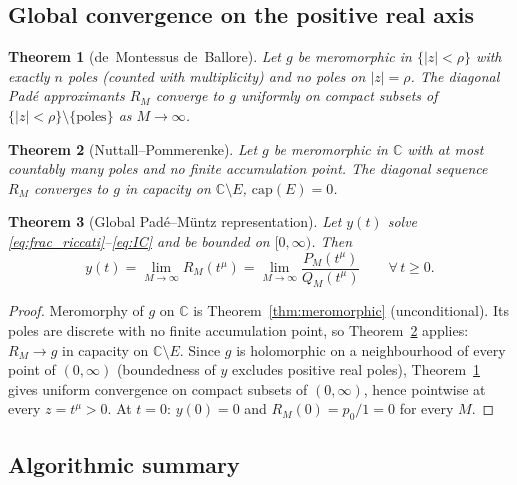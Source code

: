 \documentclass[12pt,a4paper]{amsart}
\theoremstyle{plain}
\newtheorem{theorem}{Theorem}[section]
\theoremstyle{definition}
\theoremstyle{remark}
\begin{document}
\subsection{Global convergence on the positive real axis}

\begin{theorem}[de~Montessus de~Ballore]\label{thm:dMdB}
Let $g$ be meromorphic in $\{|z|<\rho\}$ with exactly $n$ poles (counted
with multiplicity) and no poles on $|z|=\rho$. The diagonal Pad\'e
approximants $R_M$ converge to $g$ uniformly on compact subsets of
$\{|z|<\rho\}\setminus\{\text{poles}\}$ as $M\to\infty$.
\end{theorem}

\begin{theorem}[Nuttall--Pommerenke]\label{thm:NP}
Let $g$ be meromorphic in $\mathbb{C}$ with at most countably many poles
and no finite accumulation point. The diagonal sequence $R_M$ converges
to $g$ \emph{in capacity} on $\mathbb{C}\setminus E$,
$\mathrm{cap}(E)=0$.
\end{theorem}

\begin{theorem}[Global Pad\'e--M\"untz representation]\label{thm:pade_riccati}
Let $y(t)$ solve \eqref{eq:frac_riccati}--\eqref{eq:IC} and be bounded on
$[0,\infty)$. Then
\begin{equation}\label{eq:y_global_pade}
  y(t) = \lim_{M\to\infty}R_M(t^{\mu})
       = \lim_{M\to\infty}\frac{P_M(t^{\mu})}{Q_M(t^{\mu})}
  \qquad\forall\,t\ge 0.
\end{equation}
\end{theorem}

\begin{proof}
Meromorphy of $g$ on $\mathbb{C}$ is Theorem~\ref{thm:meromorphic}
(unconditional). Its poles are discrete with no finite accumulation point,
so Theorem~\ref{thm:NP} applies: $R_M\to g$ in capacity on
$\mathbb{C}\setminus E$. Since $g$ is holomorphic on a neighbourhood of
every point of $(0,\infty)$ (boundedness of $y$ excludes positive real poles),
Theorem~\ref{thm:dMdB} gives uniform convergence on compact subsets of
$(0,\infty)$, hence pointwise at every $z=t^\mu>0$.
At $t=0$: $y(0)=0$ and $R_M(0)=p_0/1=0$ for every $M$.
\end{proof}

\subsection{Algorithmic summary}
\end{document}
